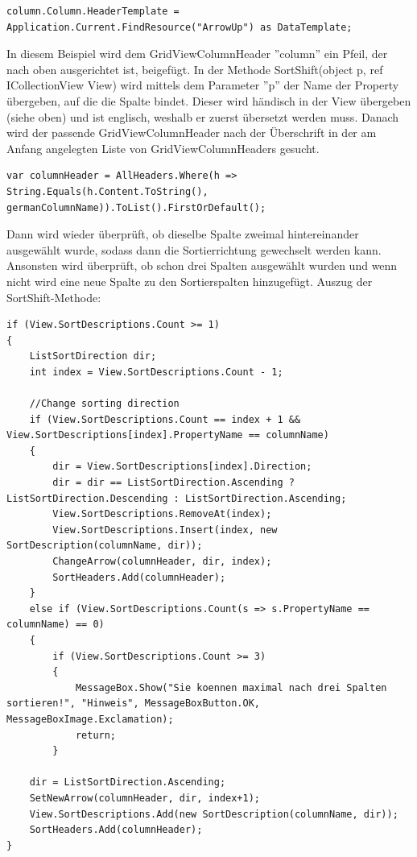 \begin{lstlisting}
column.Column.HeaderTemplate = Application.Current.FindResource("ArrowUp") as DataTemplate;
\end{lstlisting}
In diesem Beispiel wird dem GridViewColumnHeader ''column'' ein Pfeil, der nach oben ausgerichtet ist, beigefügt. \newline
In der Methode SortShift(object p, ref ICollectionView View) wird mittels dem Parameter ''p'' der Name der Property übergeben, auf die die Spalte bindet. Dieser wird händisch in der View übergeben (siehe oben) und ist englisch, weshalb er zuerst übersetzt werden muss. Danach wird der passende GridViewColumnHeader nach der Überschrift in der am Anfang angelegten Liste von GridViewColumnHeaders gesucht.
\begin{lstlisting}
var columnHeader = AllHeaders.Where(h => String.Equals(h.Content.ToString(), germanColumnName)).ToList().FirstOrDefault();
\end{lstlisting}
Dann wird wieder überprüft, ob dieselbe Spalte zweimal hintereinander ausgewählt wurde, sodass dann die Sortierrichtung gewechselt werden kann. Ansonsten wird überprüft, ob schon drei Spalten ausgewählt wurden und wenn nicht wird eine neue Spalte zu den Sortierspalten hinzugefügt.
Auszug der SortShift-Methode:

\begin{lstlisting}
if (View.SortDescriptions.Count >= 1)
{
	ListSortDirection dir;
	int index = View.SortDescriptions.Count - 1;
	
	//Change sorting direction
	if (View.SortDescriptions.Count == index + 1 && View.SortDescriptions[index].PropertyName == columnName)
	{
		dir = View.SortDescriptions[index].Direction;
		dir = dir == ListSortDirection.Ascending ? ListSortDirection.Descending : ListSortDirection.Ascending;
		View.SortDescriptions.RemoveAt(index);
		View.SortDescriptions.Insert(index, new SortDescription(columnName, dir));
		ChangeArrow(columnHeader, dir, index);
		SortHeaders.Add(columnHeader);
	}
	else if (View.SortDescriptions.Count(s => s.PropertyName == columnName) == 0)
	{
		if (View.SortDescriptions.Count >= 3)
		{
			MessageBox.Show("Sie koennen maximal nach drei Spalten sortieren!", "Hinweis", MessageBoxButton.OK, MessageBoxImage.Exclamation);
			return;
		}
		
	dir = ListSortDirection.Ascending;
	SetNewArrow(columnHeader, dir, index+1);
	View.SortDescriptions.Add(new SortDescription(columnName, dir));
	SortHeaders.Add(columnHeader);
}
\end{lstlisting}
\pagebreak 

